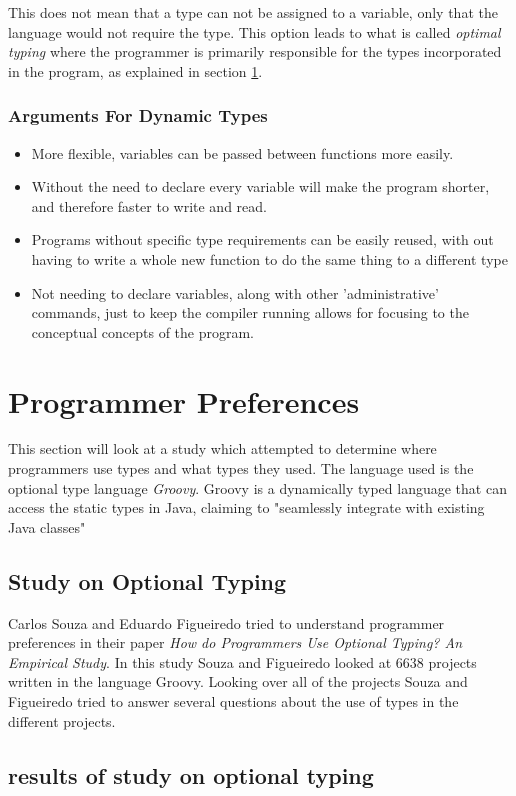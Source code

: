 \documentclass{sig-alternate}
\begin{document}
This does not mean that a type can not be assigned to a variable, only that the language would not require the type. This option leads to what is called \emph{optimal typing} where the programmer is primarily  responsible for the types incorporated in the program, as explained in section \ref{programmers}. 

\subsubsection{Arguments For Dynamic Types}
\begin{itemize}
\item More flexible, variables can be passed between functions more easily.
\item Without the need to declare every variable will make the program shorter, and therefore faster to write and read.
\item Programs without specific type requirements can be easily reused, with out having to write a whole new function to do the same thing to a different type
\item Not needing to declare variables, along with other 'administrative' commands, just to keep the compiler running allows for focusing to the conceptual concepts of the program.
\end{itemize}

\section{Programmer Preferences} \label{programmers}
This section will look at a study which attempted to determine where programmers use types and what types they used. The language used is the optional type language \emph{Groovy}. Groovy is a dynamically typed language that can access the static types in Java, claiming to "seamlessly integrate with existing Java classes"
\subsection{Study on Optional Typing}
Carlos Souza and Eduardo Figueiredo tried to understand programmer preferences in their paper \emph{How do Programmers Use Optional Typing? An Empirical Study}. In this study Souza and Figueiredo looked at 6638 projects written in the language Groovy. Looking over all of the projects Souza and Figueiredo tried to answer several questions about the use of types in the different projects.

\subsection{results of study on optional typing}
\end{document}
